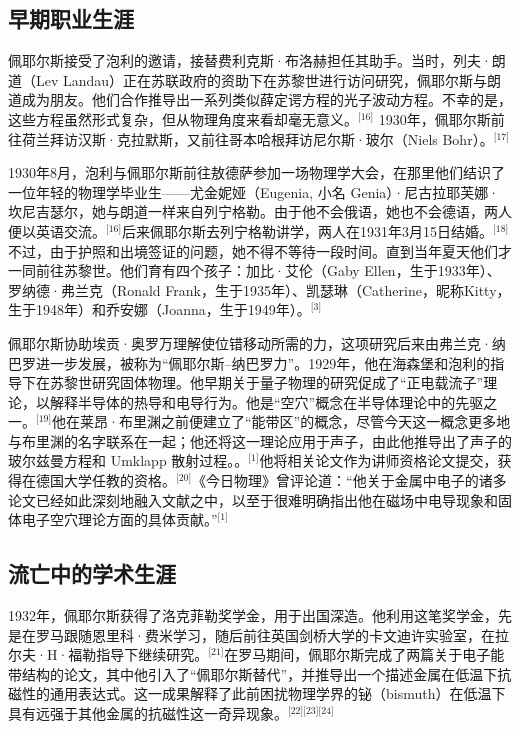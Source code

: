 \subsection{早期职业生涯}
佩耶尔斯接受了泡利的邀请，接替费利克斯·布洛赫担任其助手。当时，列夫·朗道（Lev Landau）正在苏联政府的资助下在苏黎世进行访问研究，佩耶尔斯与朗道成为朋友。他们合作推导出一系列类似薛定谔方程的光子波动方程。不幸的是，这些方程虽然形式复杂，但从物理角度来看却毫无意义。\(^\text{[16]}\)
1930年，佩耶尔斯前往荷兰拜访汉斯·克拉默斯，又前往哥本哈根拜访尼尔斯·玻尔（Niels Bohr）。\(^\text{[17]}\)

1930年8月，泡利与佩耶尔斯前往敖德萨参加一场物理学大会，在那里他们结识了一位年轻的物理学毕业生——尤金妮娅（Eugenia, 小名 Genia）·尼古拉耶芙娜·坎尼吉瑟尔，她与朗道一样来自列宁格勒。由于他不会俄语，她也不会德语，两人便以英语交流。\(^\text{[16]}\)后来佩耶尔斯去列宁格勒讲学，两人在1931年3月15日结婚。\(^\text{[18]}\)不过，由于护照和出境签证的问题，她不得不等待一段时间。直到当年夏天他们才一同前往苏黎世。他们育有四个孩子：加比·艾伦（Gaby Ellen，生于1933年）、罗纳德·弗兰克（Ronald Frank，生于1935年）、凯瑟琳（Catherine，昵称Kitty，生于1948年）和乔安娜（Joanna，生于1949年）。\(^\text{[3]}\)

佩耶尔斯协助埃贡·奥罗万理解使位错移动所需的力，这项研究后来由弗兰克·纳巴罗进一步发展，被称为“佩耶尔斯–纳巴罗力”。1929年，他在海森堡和泡利的指导下在苏黎世研究固体物理。他早期关于量子物理的研究促成了“正电载流子”理论，以解释半导体的热导和电导行为。他是“空穴”概念在半导体理论中的先驱之一。\(^\text{[19]}\)他在莱昂·布里渊之前便建立了“能带区”的概念，尽管今天这一概念更多地与布里渊的名字联系在一起；他还将这一理论应用于声子，由此他推导出了声子的玻尔兹曼方程和 Umklapp 散射过程。。\(^\text{[1]}\)他将相关论文作为讲师资格论文提交，获得在德国大学任教的资格。\(^\text{[20]}\)《今日物理》曾评论道：“他关于金属中电子的诸多论文已经如此深刻地融入文献之中，以至于很难明确指出他在磁场中电导现象和固体电子空穴理论方面的具体贡献。”\(^\text{[1]}\)
\subsection{流亡中的学术生涯}
1932年，佩耶尔斯获得了洛克菲勒奖学金，用于出国深造。他利用这笔奖学金，先是在罗马跟随恩里科·费米学习，随后前往英国剑桥大学的卡文迪许实验室，在拉尔夫·H·福勒指导下继续研究。\(^\text{[21]}\)在罗马期间，佩耶尔斯完成了两篇关于电子能带结构的论文，其中他引入了“佩耶尔斯替代”，并推导出一个描述金属在低温下抗磁性的通用表达式。这一成果解释了此前困扰物理学界的铋（bismuth）在低温下具有远强于其他金属的抗磁性这一奇异现象。\(^\text{[22][23][24]}\)

